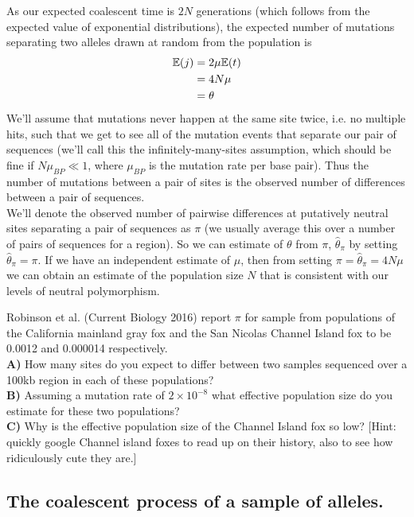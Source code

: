 As our expected coalescent time is $2N$ generations (which follows from the expected value of exponential distributions), the expected
number of mutations separating two alleles drawn at random from the
population is
%
\begin{align}
  \mathbb{E}(j) &= 2\mu\mathbb{E}(t) \\ \nonumber
  &= 4N\mu \\
  &= \theta \nonumber
\end{align}
We'll assume that mutations never happen at the same site twice,
i.e. no multiple hits, such that we get to see all of the mutation events that separate our pair
of sequences (we'll call this the infinitely-many-sites assumption,
which should be fine if $N\mu_{BP} \ll 1$, where $\mu_{BP}$ is the mutation rate per base pair). Thus the number of
mutations between a pair of sites is the observed number of
differences between a pair of sequences. \\

We'll denote the observed number of pairwise differences at putatively neutral
sites separating a pair of sequences as $\pi$ (we usually average this over a
number of pairs of sequences for a region). So we can estimate of $\theta$ from
$\pi$, $\widehat{\theta}_{\pi}$ by setting $\widehat{\theta}_{\pi}=\pi$.  If we
have an independent estimate of $\mu$, then from setting $\pi =
\widehat{\theta}_{\pi} = 4N\mu$ we can obtain an estimate of the population
size $N$ that is consistent with our levels of neutral polymorphism.

\begin{question}
Robinson et al. (Current Biology 2016) report $\pi$ for sample from
populations of the California mainland gray fox and
the San Nicolas Channel Island fox to be 0.0012 and 0.000014
respectively. \\
{\bf A)} How many sites do you expect to differ between two samples
sequenced over a 100kb region in each of these populations?\\   
{\bf B)} Assuming a mutation rate of $2\times 10^{-8}$ what
effective population size do you estimate for these two populations?
\\
{\bf C)} Why is the effective population size of the Channel Island fox
so low? [Hint: quickly google Channel island foxes to read up on their
history, also to see how ridiculously cute they are.]
\end{question}

\subsection{The coalescent process of a sample of alleles.}

